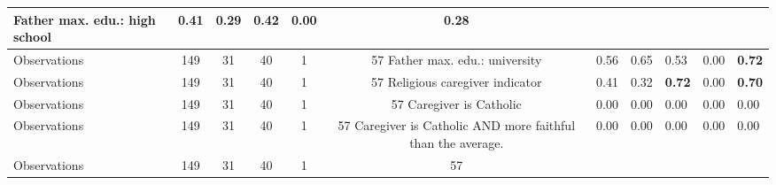 \begin{tabular}{l c c c c c c }
Father max. edu.: high school &      0.41 &      0.29 &      0.42 &      0.00 & \textbf{     0.28} \\
\midrule
Observations &       149 &        31 &        40 &         1 &        57
Father max. edu.: university &      0.56 &      0.65 &      0.53 &      0.00 & \textbf{     0.72} \\
\midrule
Observations &       149 &        31 &        40 &         1 &        57
Religious caregiver indicator &      0.41 &      0.32 & \textbf{     0.72} &      0.00 & \textbf{     0.70} \\
\midrule
Observations &       149 &        31 &        40 &         1 &        57
Caregiver is Catholic &      0.00 &      0.00 &      0.00 &      0.00 &      0.00 \\
\midrule
Observations &       149 &        31 &        40 &         1 &        57
Caregiver is Catholic AND more faithful than the average. &      0.00 &      0.00 &      0.00 &      0.00 &      0.00 \\
\midrule
Observations &       149 &        31 &        40 &         1 &        57
\bottomrule
\end{tabular}
